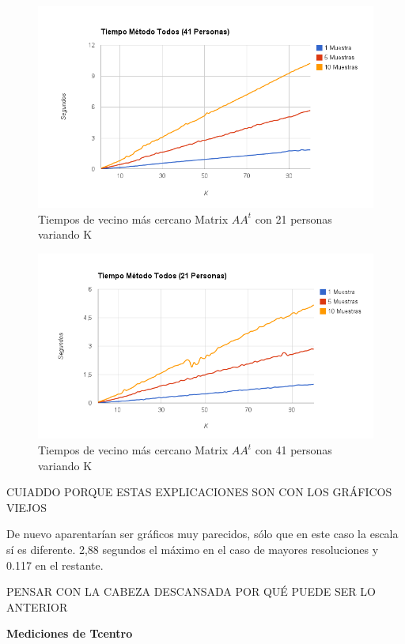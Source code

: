 \begin{figure}[H]
\includegraphics[width=1\textwidth]{img/imagef5.png}
     \caption{Tiempos de vecino más cercano Matrix $AA^t$ con 21 personas variando K}
\end{figure}

\begin{figure}[H]
\includegraphics[width=1\textwidth]{img/imagef6.png}
     \caption{Tiempos de vecino más cercano Matrix $AA^t$ con 41 personas variando K}
\end{figure}

CUIADDO PORQUE ESTAS EXPLICACIONES SON CON LOS GRÁFICOS VIEJOS

De nuevo aparentarían ser gráficos muy parecidos, sólo que en este caso la escala sí es diferente.
2,88 segundos el máximo en el caso de mayores resoluciones y 0.117 en el restante.

PENSAR CON LA CABEZA DESCANSADA POR QUÉ PUEDE SER LO ANTERIOR

\textbf{Mediciones de Tcentro }

